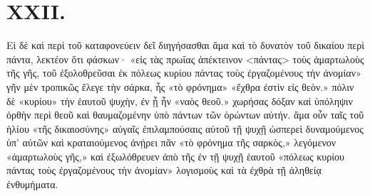 \section*{XXII.}

Εἰ δὲ καὶ περὶ τοῦ καταφονεύειν δεῖ διηγήσασθαι ἅμα καὶ τὸ δυνατὸν τοῦ δικαίου περὶ πάντα, λεκτέον ὅτι φάσκων· «εἰς τὰς πρωΐας ἀπέκτεινον <πάντας> τοὺς ἁμαρτωλοὺς τῆς γῆς, τοῦ ἐξολοθρεῦσαι ἐκ πόλεως κυρίου πάντας τοὺς ἐργαζομένους τὴν ἀνομίαν» γῆν μὲν τροπικῶς ἔλεγε τὴν σάρκα, ἧς «τὸ φρόνημα» «ἔχθρα ἐστὶν εἰς θεὸν.» πόλιν δὲ «κυρίου» τὴν ἑαυτοῦ ψυχὴν, ἐν ᾗ ἦν «ναὸς θεοῦ.» χωρήσας δόξαν καὶ ὑπόληψιν ὀρθὴν περὶ θεοῦ καὶ θαυμαζομένην ὑπὸ πάντων τῶν ὁρώντων αὐτήν. ἅμα οὖν ταῖς τοῦ ἡλίου «τῆς δικαιοσύνης» αὐγαῖς ἐπιλαμπούσαις αὐτοῦ τῇ ψυχῇ ὡσπερεὶ δυναμούμενος ὑπ' αὐτῶν καὶ κραταιούμενος ἀνῄρει πᾶν «τὸ φρόνημα τῆς σαρκὸς,» λεγόμενον «ἁμαρτωλοὺς γῆς,» καὶ ἐξωλόθρευεν ἀπὸ τῆς ἐν τῇ ψυχῇ ἑαυτοῦ «πόλεως κυρίου πάντας τοὺς ἐργαζομένους τὴν ἀνομίαν» λογισμοὺς καὶ τὰ ἐχθρὰ τῇ ἀληθείᾳ ἐνθυμήματα.

